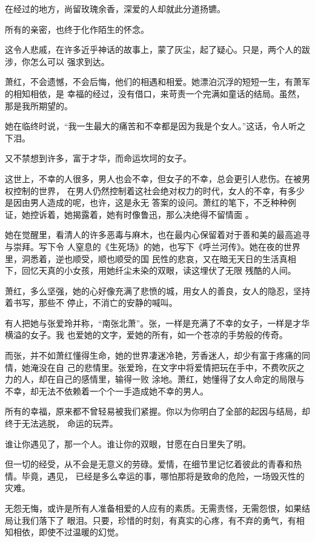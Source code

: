 \documentclass[12pt,a4paper]{article}
\begin{document}
		在经过的地方，尚留玫瑰余香，深爱的人却就此分道扬镳。

		所有的亲密，也终于化作陌生的怀念。

		这令人悲戚，在许多近乎神话的故事上，蒙了灰尘，起了疑心。只是，两个人的跋涉，你怎么可以
	强求到达。

		萧红，不会遗憾，不会后悔，他们的相遇和相爱。她漂泊沉浮的短短一生，有萧军的相知相依，是
	幸福的经过，没有借口，来苛责一个完满如童话的结局。虽然，那是我所期望的。


		她在临终时说，“我一生最大的痛苦和不幸都是因为我是个女人。”这话，令人听之下泪。

		又不禁想到许多，富于才华，而命运坎坷的女子。

		这世上，不幸的人很多，男人也会不幸，但女子的不幸，总会更引人悲伤。在被男权控制的世界，
	在男人仍然控制着这社会绝对权力的时代，女人的不幸，有多少是因由男人造成的呢，也许，这是永无
	答案的设问。萧红的笔下，不乏种种例证，她控诉着，她揭露着，她有时像鲁迅，那么决绝得不留情面
	。

		她在觉醒里，看清人的许多恶毒与麻木，也在最内心保留着对于善和美的最高追寻与崇拜。写下令
	人窒息的《生死场》的她，也写下《呼兰河传》。她在夜的世界里，洞悉着，逆也顺受，顺也顺受的国
	民性的悲哀，又在暗无天日的生活真相下，回忆天真的小女孩，用她纤尘未染的双眼，读这埋伏了无限
	残酷的人间。

		萧红，多么坚强，她的心好像充满了悲愤的城，用女人的善良，女人的隐忍，坚持着书写，那些不
	停止，不消亡的安静的喊叫。


		有人把她与张爱玲并称，“南张北萧”。张，一样是充满了不幸的女子，一样是才华横溢的女子。我
	也爱她的文字，爱她的所有，如一个苍凉的手势般的传奇。

		而张，并不如萧红懂得生命，她的世界凄迷冷艳，芳香迷人，却少有富于疼痛的同情，她淹没在自
	己的悲情里。张爱玲，在文字中将爱情把玩在手中，不费吹灰之力的人，却在自己的感情里，输得一败
	涂地。萧红，她懂得了女人命定的局限与不幸，却无法不依赖着一个个一手造成她不幸的男人。

		所有的幸福，原来都不曾轻易被我们紧握。你以为你明白了全部的起因与结局，却终于无法逃脱，
	命运的玩弄。

		谁让你遇见了，那一个人。谁让你的双眼，甘愿在白日里失了明。

		但一切的经受，从不会是无意义的劳碌。爱情，在细节里记忆着彼此的青春和热情。毕竟，遇见，
	已经是多么幸运的事，哪怕那将是致命的危险，一场毁灭性的灾难。


		无怨无悔，或许是所有人准备相爱的人应有的素质。无需责怪，无需怨恨，如果结局让我们落下了
	眼泪。只要，珍惜的时刻，有真实的心疼，有不弃的勇气，有相知相依，即使不过温暖的幻觉。
\end{document}
